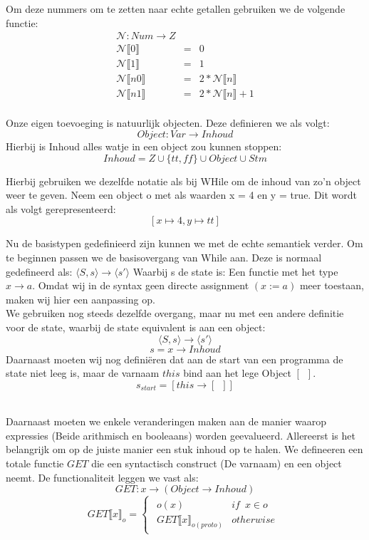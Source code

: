 \documentclass[12pt]{article}
\begin{document}
Om deze nummers om te zetten naar echte getallen gebruiken we de volgende functie:
$$
\begin{matrix}
\mathcal{N}: Num \rightarrow Z \\
\mathcal{N}\llbracket 0 \rrbracket &= &0  \\
\mathcal{N}\llbracket 1 \rrbracket &= &1 \\
\mathcal{N}\llbracket n0 \rrbracket &= &2 * \mathcal{N}\llbracket n \rrbracket \\
\mathcal{N}\llbracket n1 \rrbracket &= &2 * \mathcal{N}\llbracket n \rrbracket + 1 \\
\end{matrix}
$$

Onze eigen toevoeging is natuurlijk objecten. Deze definieren we als volgt:
$$Object : Var \rightarrow Inhoud$$ 
Hierbij is Inhoud alles watje in een object zou kunnen stoppen: 
$$Inhoud = Z \cup \{tt,ff\} \cup Object \cup Stm$$ 

Hierbij gebruiken we dezelfde notatie als bij WHile om de inhoud van zo'n object weer te geven.
Neem een object o met als waarden x = 4 en y = true. Dit wordt als volgt gerepresenteerd:
$$[x \mapsto 4, y \mapsto tt]$$

Nu de basistypen gedefinieerd zijn kunnen we met de echte semantiek verder. Om te beginnen passen we de basisovergang van While aan. Deze is normaal gedefineerd als:
$ \langle S,s \rangle \rightarrow \langle s\prime \rangle $
Waarbij s de state is: Een functie met het type
$ x \rightarrow a $.
Omdat wij in de syntax geen directe assignment $(x := a)$ meer toestaan, maken wij hier een aanpassing op.\\
We gebruiken nog steeds dezelfde overgang, maar nu met een andere definitie voor de state, waarbij de state equivalent is aan een object:
\[ \langle S,s \rangle \rightarrow \langle s\prime \rangle \]
\[ s = x \rightarrow Inhoud \]
Daarnaast moeten wij nog definiëren dat aan de start van een programma de state niet leeg is, maar de varnaam $ this $ bind aan het lege Object $ [\enspace] $.
\[ s_{start} = [this \rightarrow [\enspace]]\]
\\
\par
Daarnaast moeten we enkele veranderingen maken aan de manier waarop expressies (Beide arithmisch en booleaans) worden geevalueerd. 
Allereerst is het belangrijk om op de juiste manier een stuk inhoud op te halen. We defineeren een totale functie $ GET $ die een syntactisch construct (De varnaam) en een object neemt. De functionaliteit leggen we vast als:
\[ GET: x \rightarrow (Object \rightarrow Inhoud) \]
\[
GET\llbracket x \rrbracket_o =
\begin{cases}
\begin{matrix}
o(x) & if \enspace x \in o\\
GET\llbracket x \rrbracket_{o(proto)} & otherwise
\end{matrix}
\end{cases}
\]
\end{document}
